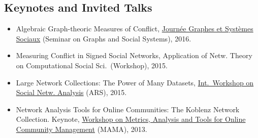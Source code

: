 \documentclass[line,margin]{res}
\begin{document}
\begin{resume}
\section{Keynotes and Invited Talks}
\begin{itemize}
\item Algebraic Graph-theoric Measures of Conflict, 
  \href{http://jgss.sciencesconf.org/}{Journée Graphes et Systèmes
    Sociaux} (Seminar on Graphs and Social Systems), 2016.  
\item Measuring Conflict in Signed Social Networks, 
  Application of Netw. Theory on Computational Social Sci.\ (Workshop), 2015.
\item Large Network Collections:  The Power of Many Datasets,
  \href{http://www.ars15.unisa.it/}{Int.\ Workshop on Social
    Netw. Analysis} (ARS), 2015. 
\item Network Analysis Tools for Online Communities: The Koblenz Network
  Collection. Keynote, \href{http://mama.west.uni-koblenz.de/}{Workshop
    on Metrics, Analysis and Tools for Online Community Management}
  (MAMA), 2013.  
\end{itemize}


\end{resume}
\end{document}
